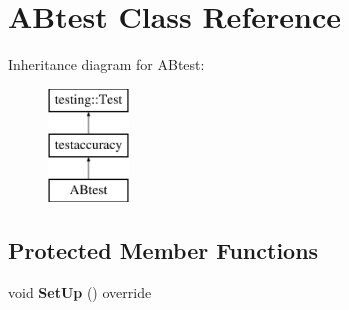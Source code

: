 \hypertarget{class_a_btest}{}\section{A\+Btest Class Reference}
\label{class_a_btest}
Inheritance diagram for A\+Btest\+:\begin{figure}[H]
\begin{center}
\leavevmode
\includegraphics[height=3.000000cm]{class_a_btest}
\end{center}
\end{figure}
\subsection*{Protected Member Functions}
\begin{DoxyCompactItemize}
\item 
\mbox{\label{class_a_btest_a096ee9752e6e3af7ad35a140d70f0a1e}} 
void {\bfseries Set\+Up} () override
\end{DoxyCompactItemize}
